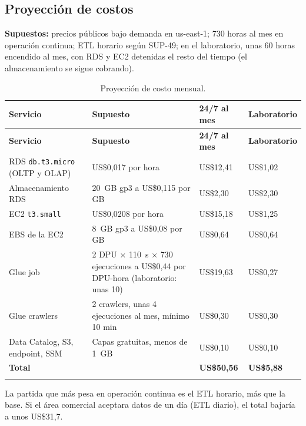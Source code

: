 \subsection{Proyección de costos}
\textbf{Supuestos:} precios públicos bajo demanda en us-east-1; 730 horas al mes en operación continua; ETL horario según SUP-49; en el laboratorio, unas 60 horas encendido al mes, con RDS y EC2 detenidas el resto del tiempo (el almacenamiento se sigue cobrando).

\begin{longtable}{@{}L{3.6cm} L{6.0cm} R{2.4cm} R{2.6cm}@{}}
\toprule \textbf{Servicio} & \textbf{Supuesto} & \textbf{24/7 al mes} & \textbf{Laboratorio} \\ \midrule \endfirsthead
\toprule \textbf{Servicio} & \textbf{Supuesto} & \textbf{24/7 al mes} & \textbf{Laboratorio} \\ \midrule \endhead
RDS \texttt{db.t3.micro} (OLTP y OLAP) & US\$0,017 por hora & US\$12,41 & US\$1,02 \\
Almacenamiento RDS & 20~GB gp3 a US\$0,115 por GB & US\$2,30 & US\$2,30 \\
EC2 \texttt{t3.small} & US\$0,0208 por hora & US\$15,18 & US\$1,25 \\
EBS de la EC2 & 8~GB gp3 a US\$0,08 por GB & US\$0,64 & US\$0,64 \\
Glue job & 2 DPU $\times$ 110~s $\times$ 730 ejecuciones a US\$0,44 por DPU-hora (laboratorio: unas 10) & US\$19,63 & US\$0,27 \\
Glue crawlers & 2 crawlers, unas 4 ejecuciones al mes, mínimo 10 min & US\$0,30 & US\$0,30 \\
Data Catalog, S3, endpoint, SSM & Capas gratuitas, menos de 1~GB & US\$0,10 & US\$0,10 \\
\midrule
\textbf{Total} & & \textbf{US\$50,56} & \textbf{US\$5,88} \\
\bottomrule
\caption{Proyección de costo mensual.}
\end{longtable}

La partida que más pesa en operación continua es el ETL horario, más que la base. Si el área comercial aceptara datos de un día (ETL diario), el total bajaría a unos US\$31,7.

